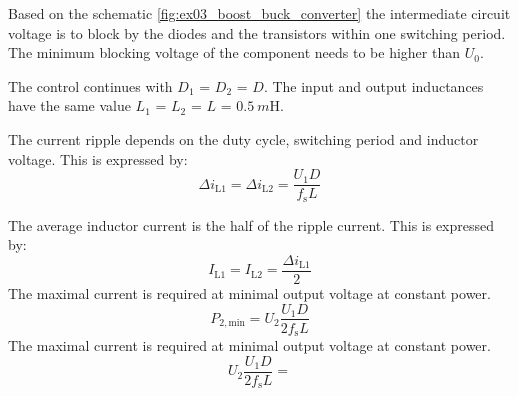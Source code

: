 
\begin{solutionblock}
    Based on the schematic \autoref{fig:ex03_boost_buck_converter} the intermediate circuit voltage is to block by the diodes and 
    the transistors within one switching period. The minimum blocking voltage of the component needs to be higher than $U_\mathrm{0}$.
\end{solutionblock}

\vspace{2em}\par
The control continues with $D_\mathrm{1}$ = $D_\mathrm{2}$ = $D$. The input and output inductances 
have the same value $L_\mathrm{1}$ = $L_\mathrm{2}$ = $L$ = $\SI{0.5}{m\henry}$.


\begin{solutionblock}
    The current ripple depends on the duty cycle, switching period and inductor voltage.
    This is expressed by:
    \begin{equation}
        \Delta i_\mathrm{L1}=\Delta i_\mathrm{L2}=\frac{U_\mathrm{1}D}{f_\mathrm{s}L}
    \end{equation}
\end{solutionblock}


\begin{solutionblock}
    The average inductor current is the half of the ripple current. This is expressed by:
    \begin{equation}
        I_\mathrm{L1}=I_\mathrm{L2}=\frac{\Delta i_\mathrm{L1}}{2}
    \end{equation}
    The maximal current is required at minimal output voltage at constant power.
    \begin{equation}
        P_\mathrm{2,min}=U_\mathrm{2}\frac{U_\mathrm{1}D}{2f_\mathrm{s}L}
    \end{equation}
    The maximal current is required at minimal output voltage at constant power.
    \begin{equation}
        U_\mathrm{2}\frac{U_\mathrm{1}D}{2f_\mathrm{s}L}=
    \end{equation}
\end{solutionblock}



